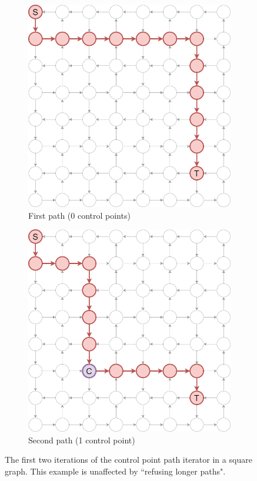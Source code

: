 \documentclass[12pt, oneside]{report}
\theoremstyle{plain}
\theoremstyle{definition}
\theoremstyle{indented}
\begin{document}
\begin{appendices}
\begin{figure}[ht]
\begin{subfigure}{.5\textwidth}
  \centering
\includegraphics[width=0.8\linewidth]{images/pathiterators/examples-Control point-1.png}
  \caption{First path (0 control points)}
\end{subfigure}
\begin{subfigure}{.5\textwidth}
  \centering
\includegraphics[width=0.8\linewidth]{images/pathiterators/examples-Control point-2.png}
  \caption{Second path (1 control point)}
\end{subfigure}
\caption{The first two iterations of the control point path iterator in a square graph. This example is unaffected by ``refusing longer paths".}
\label{fig:pathexamples-controlpoint}
\end{figure}
\end{appendices}


\newpage
\printbibliography
\end{document}
